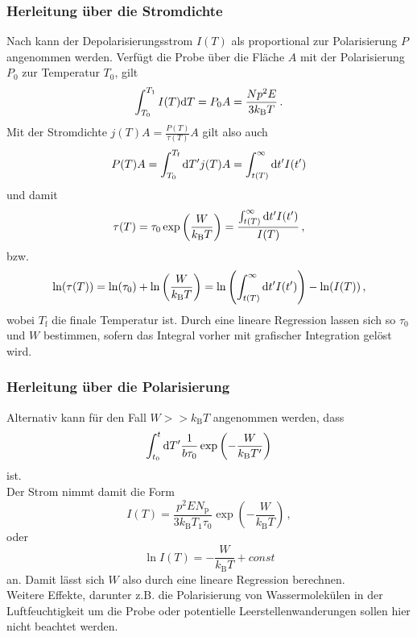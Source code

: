 \subsubsection{Herleitung über die Stromdichte}

Nach \cite[S. ~4]{fuller} kann der Depolarisierungsstrom $I(T)$ als proportional zur Polarisierung $P$ angenommen werden.
Verfügt die Probe über die Fläche $A$ mit der Polarisierung $P_0$ zur Temperatur $T_0$, gilt
\begin{equation*}
    \int^{T_1}_{T_0} I(T) \mathrm{d} T = P_0 A = \frac{N p^2 E}{3 k_\text{B}T} \,.
\end{equation*}
Mit der Stromdichte $j(T) A = \frac{P(T)}{\tau(T)} A$ gilt also auch
\begin{equation*}
    P(T) A = \int^{T_\text{f}}_{T_0} \mathrm{d} T' j(T) A  = \int^\infty_{t(T)} \mathrm{d} t' I(t')
\end{equation*}
und damit
\begin{equation}
    \tau(T) = \tau_0 \exp \left(\frac{W}{k_\text{B} T} \right) =  \frac{\int^\infty_{t(T)} \mathrm{d} t' I(t')}{I(T)} \,,
    \label{eq:relaxozeitpol}
\end{equation}
bzw.
\begin{equation}
    \ln(\tau(T)) = \ln(\tau_0) + \ln\left(\frac{W}{k_\text{B} T} \right) =  \ln \left(\int^\infty_{t(T)} \mathrm{d} t' I(t') \right) - \ln (I(T)) \,,
    \label{eq:lnrelaxozeitpol}
\end{equation}
wobei $T_\text{f}$ die finale Temperatur ist.
Durch eine lineare Regression lassen sich so $\tau_0$ und $W$ bestimmen, sofern das Integral vorher mit grafischer Integration gelöst wird.

\subsubsection{Herleitung über die Polarisierung}

Alternativ kann für den Fall $W >> k_\text{B} T$ angenommen werden, dass
\begin{equation*}
    \int^t_{t_0} \mathrm{d} T' \frac{1}{b \tau_0}  \exp \left(-\frac{W}{k_\text{B} T'} \right)
\end{equation*}
ist. \\
Der Strom nimmt damit die Form
\begin{equation*}
    I(T) = \frac{p^2 E N_\text{p}}{3 k_\text{B} T_1 \tau_0} \exp(-\frac{W}{k_\text{B} T}) \, ,
\end{equation*}
oder
\begin{equation}
    \ln I(T) = - \frac{W}{k_\text{B} T} + const
    \label{eq:lnStrom}
\end{equation}
an.
Damit lässt sich $W$ also durch eine lineare Regression berechnen. \\

Weitere Effekte, darunter z.B. die Polarisierung von Wassermolekülen in der Luftfeuchtigkeit um die Probe oder potentielle Leerstellenwanderungen sollen hier nicht beachtet werden.



